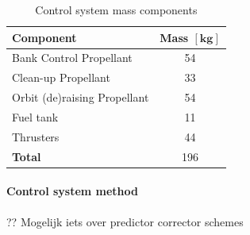 \begin{table}[h]
\centering
\caption{Control system mass components}
\label{tab:controlmassbreakdown}
\begin{tabular}{|l|c|} \hline
\textbf{Component}                 & \textbf{Mass $\mathbf{[kg]}$} \\ \hline \hline
Bank Control Propellant      &     54       \\ \hline
Clean-up Propellant          &     33       \\ \hline
Orbit (de)raising Propellant &     54       \\ \hline
Fuel tank              		 &     11      \\ \hline
Thrusters                	 &     44     \\ \hline \hline
\textbf{Total}               &     196      \\ \hline
\end{tabular}
\end{table}

\paragraph{Control system method}

?? Mogelijk iets over predictor corrector schemes

